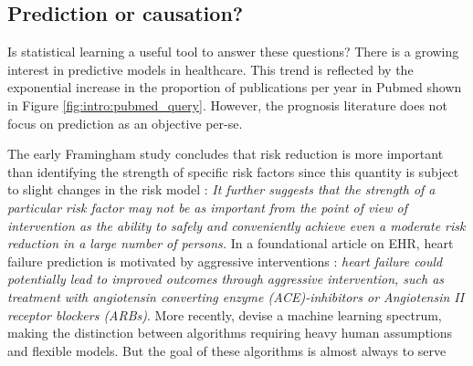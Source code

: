 \documentclass[french,12pt,twoside,a4paper]{book}
\begin{document}
\begin{background_box_left}

  \subsection{Prediction or causation?}%
  \label{subsec:intro:prediction_causation}%

  Is statistical learning a useful tool to answer these questions? There is a
  growing interest in predictive models in healthcare. This trend is reflected
  by the exponential increase in the proportion of publications per year in
  Pubmed shown in Figure \ref{fig:intro:pubmed_query}. However, the prognosis
  literature does not focus on prediction as an objective per-se.

  The early Framingham study concludes that risk reduction is more important
  than identifying the strength of specific risk factors since this quantity is
  subject to slight changes in the risk model \citep{brand1976multivariate}:
  \textit{It further suggests that the strength of a particular risk factor may
    not be as important from the point of view of intervention as the ability to
    safely and conveniently achieve even a moderate risk reduction in a large
    number of persons.} In a foundational article on EHR, heart failure prediction
  is motivated by aggressive interventions \citep{wu2010prediction}:
  \textit{heart failure could potentially lead to improved outcomes through
    aggressive intervention, such as treatment with angiotensin converting enzyme
    (ACE)-inhibitors or Angiotensin II receptor blockers (ARBs)}. More recently,
  \cite{beam2018big} devise a machine learning spectrum, making the distinction
  between algorithms requiring heavy human assumptions and flexible models. But
  the goal of these algorithms is almost always to serve

\end{background_box_left}
\end{document}
